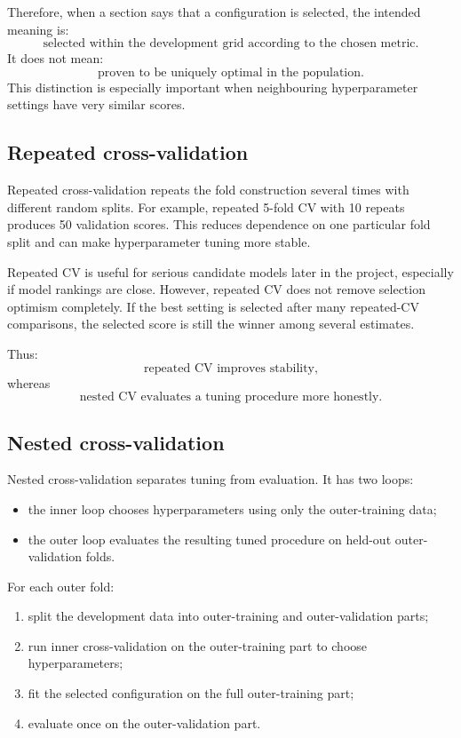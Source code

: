 Therefore, when a section says that a configuration is selected, the intended meaning is:
\[
\text{selected within the development grid according to the chosen metric.}
\]
It does not mean:
\[
\text{proven to be uniquely optimal in the population.}
\]
This distinction is especially important when neighbouring hyperparameter settings have very similar scores.

\subsection{Repeated cross-validation}

Repeated cross-validation repeats the fold construction several times with different random splits. For example, repeated 5-fold CV with 10 repeats produces 50 validation scores. This reduces dependence on one particular fold split and can make hyperparameter tuning more stable.

Repeated CV is useful for serious candidate models later in the project, especially if model rankings are close. However, repeated CV does not remove selection optimism completely. If the best setting is selected after many repeated-CV comparisons, the selected score is still the winner among several estimates.

Thus:
\[
\text{repeated CV improves stability,}
\]
whereas
\[
\text{nested CV evaluates a tuning procedure more honestly.}
\]

\subsection{Nested cross-validation}

Nested cross-validation separates tuning from evaluation. It has two loops:
\begin{itemize}
    \item the inner loop chooses hyperparameters using only the outer-training data;
    \item the outer loop evaluates the resulting tuned procedure on held-out outer-validation folds.
\end{itemize}

For each outer fold:
\begin{enumerate}
    \item split the development data into outer-training and outer-validation parts;
    \item run inner cross-validation on the outer-training part to choose hyperparameters;
    \item fit the selected configuration on the full outer-training part;
    \item evaluate once on the outer-validation part.
\end{enumerate}

